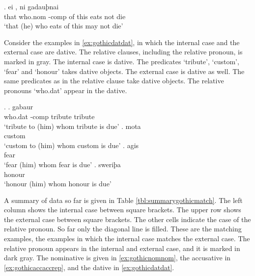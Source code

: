 \exg. ei    , ni gadauþnai\\
 that who.\ac{nom} -\ac{comp} {of this} eats\scsub{[nom]} not die\scsub{[nom]}\\
 `that (he) who eats of this may not die' \label{ex:gothicnomnom}

 Consider the examples in \ref{ex:gothicdatdat}, in which the internal case and the external case are dative.
 The relative clauses, including the relative pronoun, is marked in gray.
 The internal case is dative. The predicates  `tribute',  `custom',  `fear' and  `honour' takes dative objects.
 The external case is dative as well. The same predicates as in the relative clause take dative objects.
 The relative pronouns  `who.\ac{dat}' appear in the dative.

\ex.\label{ex:gothicdatdat}
\ag.    gabaur\\
 who.\ac{dat} -\ac{comp} tribute\scsub{[dat]} tribute\scsub{[dat]}\\
 `tribute to (him) whom tribute is due'
\bg.    mota\\
    custom\scsub{[dat]}\\
 `custom to (him) whom custom is due'
\bg.    agis\\
    fear\scsub{[dat]}\\
 `fear (him) whom fear is due'
\bg.    sweriþa\\
    honour\scsub{[dat]}\\
 `honour (him) whom honour is due' 

A summary of data so far is given in Table \ref{tbl:summarygothicmatch}. The left column shows the internal case between square brackets. The upper row shows the external case between square brackets. The other cells indicate the case of the relative pronoun.
So far only the diagonal line is filled. These are the matching examples, the examples in which the internal case matches the external case. The relative pronoun appears in the internal and external case, and it is marked in dark gray. The nominative is given in \ref{ex:gothicnomnom}, the accusative in \ref{ex:gothicaccaccrep}, and the dative in \ref{ex:gothicdatdat}.

